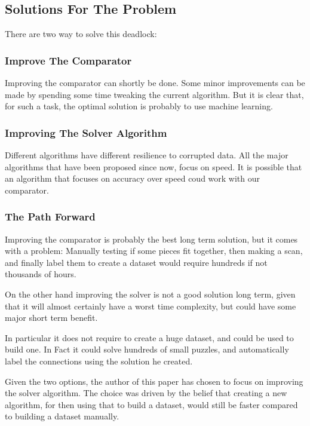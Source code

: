 \documentclass{article}
\begin{document}
\subsection{Solutions For The Problem}

There are two way to solve this deadlock:

\subsubsection{Improve The Comparator}
	
Improving the comparator can shortly be done.
Some minor improvements can be made by spending some time tweaking the current algorithm.
But it is clear that, for such a task,
the optimal solution is probably to use machine learning.

\subsubsection{Improving The Solver Algorithm}

Different algorithms have different resilience to corrupted data.
All the major algorithms that have been proposed since now, focus on speed.
It is possible that an algorithm that focuses on accuracy over speed
coud work with our comparator.

\subsubsection{The Path Forward}

Improving the comparator is probably the best long term solution,
but it comes with a problem:\newline
Manually testing if some pieces fit together, then making a scan, and finally label
them to create a dataset would require hundreds if not thousands of hours.

On the other hand improving the solver is not a good solution long term,
given that it will almost certainly have a worst time complexity,
but could have some major short term benefit.

In particular it does not require to create a huge dataset,
and could be used to build one.
In Fact it could solve hundreds of small puzzles,
and automatically label the connections using the solution he created.

Given the two options, the author of this paper has chosen to focus on improving
the solver algorithm. The choice was driven by the belief that creating a new algorithm,
for then using that to build a dataset,
would still be faster compared to building a dataset manually.
\end{document}
